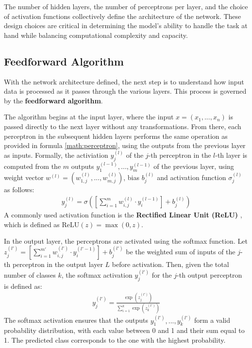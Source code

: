The number of hidden layers, the number of perceptrons per layer,
and the choice of activation functions collectively define the architecture of the network.
These design choices are critical in determining the model's ability to handle the task at hand
while balancing computational complexity and capacity.

\subsection{Feedforward Algorithm}
\label{sec:feedforward}
With the network architecture defined,
the next step is to understand how input data is processed as it passes through the various layers.
This process is governed by the \textbf{feedforward algorithm}.

The algorithm begins at the input layer,
where the input $x = (x_1, ..., x_n)$ is passed directly to the next layer without any transformations. 
From there, each perceptron in the subsequent hidden layers
performs the same operation as provided in formula \ref{math:perceptron},
using the outputs from the previous layer as inputs.
Formally, the activiation $y_j^{(l)}$ of the $j$-th perceptron in the $l$-th layer
is computed from the $m$ outputs $y_1^{(l-1)}, ..., y_m^{(l-1)}$ of the previous layer,
using weight vector $w^{(l)} = (w_{1,j}^{(l)}, ..., w_{m,j}^{(l)})$, bias $b_j^{(l)}$
and activation function $\sigma_j^{(l)}$ as follows:
\begin{align}
	y_j^{(l)} = \sigma\left(\left[\sum_{i = 1}^m w_{i,j}^{(l)} \cdot y_i^{(l-1)} \right] + b_j^{(l)}\right)
\end{align}
A commonly used activation function is the \textbf{Rectified Linear Unit (ReLU)} \cite{relu},  
which is defined as $\text{ReLU}(z) = \max(0, z)$.

In the output layer, the perceptrons are activated using the softmax function.
Let $z_j^{(l')} = \left[\sum_{i = 1}^{m'} w_{i,j}^{(l')} \cdot y_i^{(l'-1)} \right] + b_j^{(l')}$ be 
the weighted sum of inputs of the $j$-th perceptron in the output layer $L$ before activation.
Then, given the total number of classes $k$, 
the softmax activation $y_j^{(l')}$ for the $j$-th output perceptron is defined as:
\begin{align}
  y_j^{(l')} = \frac{\exp(z_j^{(l')})}{\sum_{i=1}^k \exp(z_k^{(l')})}
\end{align}
The softmax activation ensures that the outputs $y_1^{(l')},...,y_k^{(l')}$
form a valid probability distribution,
with each value between 0 and 1 and their sum equal to 1.
The predicted class corresponds to the one with the highest probability.

